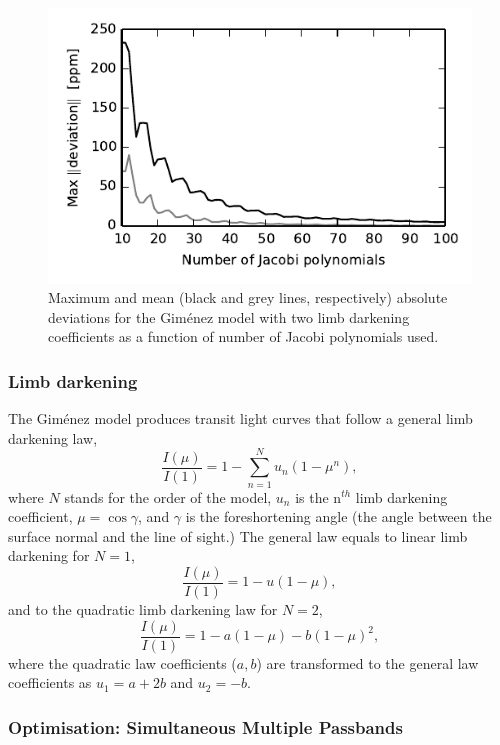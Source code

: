 \documentclass[usenatbib,usegraphicx,useAMS]{mn2e}
\newcommand{\gimenez}{Gim\'enez\xspace}
\begin{document}
{\begin{figure}
 \centering
 \includegraphics[width=\columnwidth]{gimenez_abs_error.pdf}
 \caption{Maximum and mean (black and grey lines, respectively) absolute deviations for the \gimenez model with two limb 
darkening coefficients as a function of number of Jacobi polynomials used.} \label{fig:gimenez_error}
\end{figure}

\subsubsection{Limb darkening}
The \gimenez model produces transit light curves that follow a general limb darkening law,
\begin{equation} \label{eq:ld_general}
 \frac{I(\mu)}{I(1)} = 1 - \sum_{n=1}^N u_n (1-\mu^n), 
\end{equation}
where $N$ stands for the order of the model, $u_n$ is the n$^{th}$ limb darkening coefficient, $\mu = \cos \gamma$, and 
$\gamma$ is the foreshortening angle (the angle between the surface normal and the line of sight.) The general law 
equals to linear limb darkening for $N=1$,
\begin{equation}
 \frac{I(\mu)}{I(1)} = 1 - u(1-\mu),
\end{equation}
and to the quadratic limb darkening law for $N=2$,
\begin{equation}
 \frac{I(\mu)}{I(1)} = 1 - a(1-\mu) - b(1-\mu)^2,
\end{equation}
where the quadratic law coefficients ($a,b$) are transformed to the general law coefficients as $u_1 = a+2b$ and $u_2 = -b$.

\subsubsection{Optimisation: Simultaneous Multiple Passbands}
\label{sec:gimenez_multicolor}

}
\end{document}
